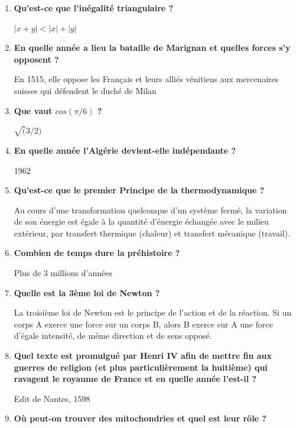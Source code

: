 \documentclass[12pt]{article}
\begin{document}
\justify %


\begin{enumerate}
  \item \textbf{Qu'est-ce que l'inégalité triangulaire ?} 
  
  $|x + y| < |x| + |y|$

  \item \textbf{En quelle année a lieu la bataille de Marignan et quelles forces s'y opposent ?}
  
  En 1515, elle oppose les Français et leurs alliés vénitiens aux mercenaires suisses qui défendent le duché de Milan

  \item \textbf{Que vaut $cos(\pi / 6)$ ?}
  
  $\sqrt(3/2)$

  \item \textbf{En quelle année l'Algérie devient-elle indépendante ?}
  
  1962

  \item \textbf{Qu'est-ce que le premier Principe de la thermodynamique ?}
  
  Au cours d'une transformation quelconque d'un système fermé, la variation de son énergie est égale à la quantité d'énergie échangée avec le milieu extérieur, par transfert thermique (chaleur) et transfert mécanique (travail). 
  
  \item \textbf{Combien de temps dure la préhistoire ?}
  
  Plus de 3 millions d'années
  
  \item \textbf{Quelle est la 3ème loi de Newton ?}
  
  La troisième loi de Newton est le principe de l'action et de la réaction. Si un corps A exerce une force sur un corps B, alors B exerce sur A une force d'égale intensité, de même direction et de sens opposé.
  
  \item \textbf{Quel texte est promulgué par Henri IV afin de mettre fin aux guerres de religion (et plus particulièrement la huitième) qui ravagent le royaume de France et en quelle année l'est-il ?}
  
  Edit de Nantes, 1598

  \item \textbf{Où peut-on trouver des mitochondries et quel est leur rôle ?}
  

\end{enumerate}
\end{document}
